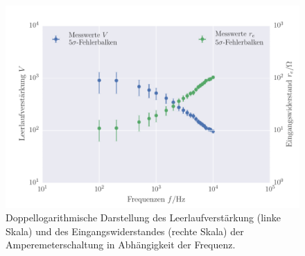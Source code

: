 \FloatBarrier
\begin{figure}[!h]
\centering
\includegraphics[scale=1]{../Grafiken/Amperemeter_Leerlaufverstaerkung_Eingangswiderstand.pdf}
\caption{Doppellogarithmische Darstellung des Leerlaufverstärkung (linke Skala) und des Eingangswiderstandes 
	(rechte Skala) der Amperemeterschaltung in Abhängigkeit der
	Frequenz.\label{fig:amperemeter_leerlaufverstaerkung_eingangswiderstand}}
\end{figure}
\FloatBarrier